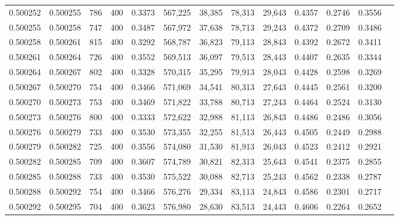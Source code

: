 \begin{tabular}{rrrrrrrrrrrrr}
0.500252 & 0.500255 &    786 & 400 &                                     0.3373 & 567,225 &  38,385 &  78,313 &  29,643 & 0.4357 & 0.2746 & 0.3556 \\
0.500255 & 0.500258 &    747 & 400 &                                     0.3487 & 567,972 &  37,638 &  78,713 &  29,243 & 0.4372 & 0.2709 & 0.3486 \\
0.500258 & 0.500261 &    815 & 400 &                                     0.3292 & 568,787 &  36,823 &  79,113 &  28,843 & 0.4392 & 0.2672 & 0.3411 \\
0.500261 & 0.500264 &    726 & 400 &                                     0.3552 & 569,513 &  36,097 &  79,513 &  28,443 & 0.4407 & 0.2635 & 0.3344 \\
0.500264 & 0.500267 &    802 & 400 &                                     0.3328 & 570,315 &  35,295 &  79,913 &  28,043 & 0.4428 & 0.2598 & 0.3269 \\
0.500267 & 0.500270 &    754 & 400 &                                     0.3466 & 571,069 &  34,541 &  80,313 &  27,643 & 0.4445 & 0.2561 & 0.3200 \\
0.500270 & 0.500273 &    753 & 400 &                                     0.3469 & 571,822 &  33,788 &  80,713 &  27,243 & 0.4464 & 0.2524 & 0.3130 \\
0.500273 & 0.500276 &    800 & 400 &                                     0.3333 & 572,622 &  32,988 &  81,113 &  26,843 & 0.4486 & 0.2486 & 0.3056 \\
0.500276 & 0.500279 &    733 & 400 &                                     0.3530 & 573,355 &  32,255 &  81,513 &  26,443 & 0.4505 & 0.2449 & 0.2988 \\
0.500279 & 0.500282 &    725 & 400 &                                     0.3556 & 574,080 &  31,530 &  81,913 &  26,043 & 0.4523 & 0.2412 & 0.2921 \\
0.500282 & 0.500285 &    709 & 400 &                                     0.3607 & 574,789 &  30,821 &  82,313 &  25,643 & 0.4541 & 0.2375 & 0.2855 \\
0.500285 & 0.500288 &    733 & 400 &                                     0.3530 & 575,522 &  30,088 &  82,713 &  25,243 & 0.4562 & 0.2338 & 0.2787 \\
0.500288 & 0.500292 &    754 & 400 &                                     0.3466 & 576,276 &  29,334 &  83,113 &  24,843 & 0.4586 & 0.2301 & 0.2717 \\
0.500292 & 0.500295 &    704 & 400 &                                     0.3623 & 576,980 &  28,630 &  83,513 &  24,443 & 0.4606 & 0.2264 & 0.2652 \\

\end{tabular}
